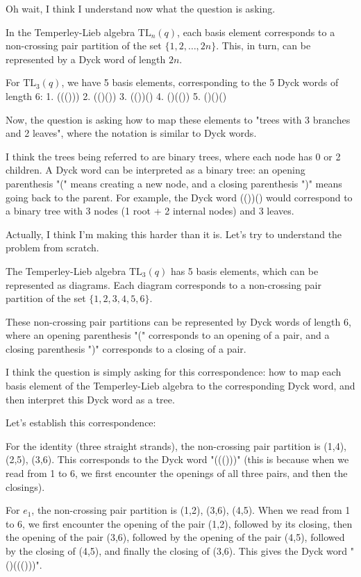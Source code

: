 \documentclass[12p]{article}
\newcounter{reasoningcounter}
\newenvironment{reasoning}[1][]
{\refstepcounter{reasoningcounter}%
\begin{tcolorbox}[
    title=Reasoning \thereasoningcounter: #1,
    colback=white, %
    colframe=gray,
    coltext=black, %
    fonttitle=\bfseries\normalsize,
    top=2mm,
    bottom=2mm,
    enlarge top initially by=5mm
]
\small
}
{\end{tcolorbox}}
\begin{document}
\begin{reasoning}
Oh wait, I think I understand now what the question is asking.

In the Temperley-Lieb algebra $\text{TL}_n(q)$, each basis element corresponds to a non-crossing pair partition of the set $\{1, 2, \ldots, 2n\}$. This, in turn, can be represented by a Dyck word of length $2n$.

For $\text{TL}_3(q)$, we have 5 basis elements, corresponding to the 5 Dyck words of length 6:
1. ((()))
2. (()())
3. (())()
4. ()(())
5. ()()()

Now, the question is asking how to map these elements to "trees with 3 branches and 2 leaves", where the notation is similar to Dyck words. 

I think the trees being referred to are binary trees, where each node has 0 or 2 children. A Dyck word can be interpreted as a binary tree: an opening parenthesis "(" means creating a new node, and a closing parenthesis ")" means going back to the parent. For example, the Dyck word (())() would correspond to a binary tree with 3 nodes (1 root + 2 internal nodes) and 3 leaves.

Actually, I think I'm making this harder than it is. Let's try to understand the problem from scratch.

The Temperley-Lieb algebra $\text{TL}_3(q)$ has 5 basis elements, which can be represented as diagrams. Each diagram corresponds to a non-crossing pair partition of the set $\{1, 2, 3, 4, 5, 6\}$.

These non-crossing pair partitions can be represented by Dyck words of length 6, where an opening parenthesis "(" corresponds to an opening of a pair, and a closing parenthesis ")" corresponds to a closing of a pair.

I think the question is simply asking for this correspondence: how to map each basis element of the Temperley-Lieb algebra to the corresponding Dyck word, and then interpret this Dyck word as a tree.

Let's establish this correspondence:

For the identity (three straight strands), the non-crossing pair partition is {(1,4), (2,5), (3,6)}. This corresponds to the Dyck word "((()))" (this is because when we read from 1 to 6, we first encounter the openings of all three pairs, and then the closings).

For $e_1$, the non-crossing pair partition is {(1,2), (3,6), (4,5)}. When we read from 1 to 6, we first encounter the opening of the pair (1,2), followed by its closing, then the opening of the pair (3,6), followed by the opening of the pair (4,5), followed by the closing of (4,5), and finally the closing of (3,6). This gives the Dyck word "()((()))".


\end{reasoning}
\end{document}
